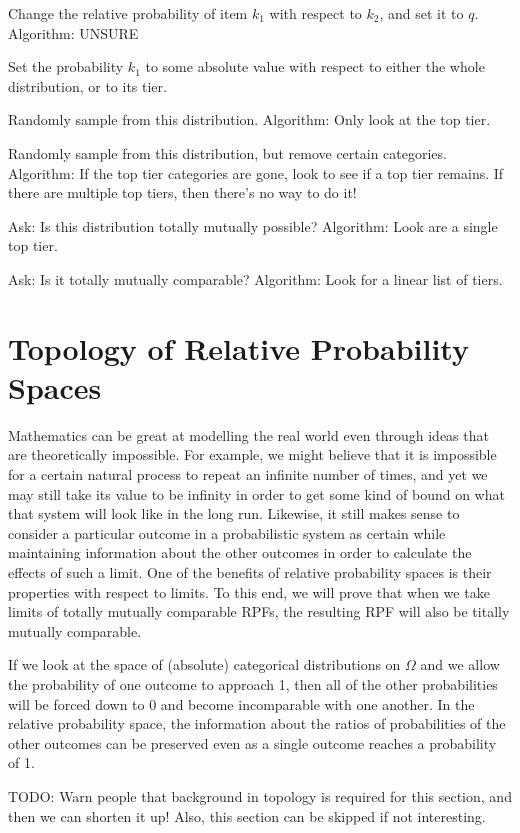 \documentclass[twoside]{article}
\theoremstyle{plain}%
\theoremstyle{definition}
\theoremstyle{remark}
\begin{document}
Change the relative probability of item \(k_1\) with respect to \(k_2\), and set it to \(q\). Algorithm: UNSURE

Set the probability \(k_1\) to some absolute value with respect to either the whole distribution, or to its tier.

Randomly sample from this distribution. Algorithm: Only look at the top tier.

Randomly sample from this distribution, but remove certain categories. Algorithm: If the top tier categories are gone, look to see if a top tier remains. If there are multiple top tiers, then there's no way to do it!

Ask: Is this distribution totally mutually possible? Algorithm: Look are a single top tier.

Ask: Is it totally mutually comparable? Algorithm: Look for a linear list of tiers.

\section{Topology of Relative Probability Spaces}

Mathematics can be great at modelling the real world even through ideas that are theoretically impossible. For example, we might believe that it is impossible for a certain natural process to repeat an infinite number of times, and yet we may still take its value to be infinity in order to get some kind of bound on what that system will look like in the long run. Likewise, it still makes sense to consider a particular outcome in a probabilistic system as certain while maintaining information about the other outcomes in order to calculate the effects of such a limit. One of the benefits of relative probability spaces is their properties with respect to limits. To this end, we will prove that when we take limits of totally mutually comparable RPFs, the resulting RPF will also be titally mutually comparable.

If we look at the space of (absolute) categorical distributions on \(\Omega\) and we allow the probability of one outcome to approach 1, then all of the other probabilities will be forced down to 0 and become incomparable with one another. In the relative probability space, the information about the ratios of probabilities of the other outcomes can be preserved even as a single outcome reaches a probability of 1.

TODO: Warn people that background in topology is required for this section, and then we can shorten it up! Also, this section can be skipped if not interesting.
\end{document}
